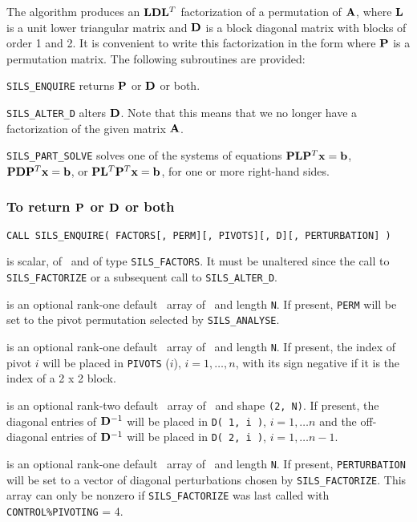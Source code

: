 \documentclass{galahad}
\newcommand{\packagename}{SILS}
\begin{document}
The algorithm produces an ${\mathbf{L}} {\mathbf{D}} {\mathbf{L}}^T$ factorization 
of a permutation of ${\mathbf{A}}$, where ${\mathbf{L}}$ is a unit lower triangular 
matrix and ${\mathbf{D}}$ is a block diagonal matrix with blocks of order 
1 and 2. It is convenient to write this factorization in the form 
where ${\mathbf{P}}$ is a permutation matrix. The following subroutines 
are provided: 
\begin{description} 
\ittf{} {\tt \packagename\_ENQUIRE} returns ${\mathbf{P}}$ or ${\mathbf{D}}$ or both. 
 
\ittf{} {\tt \packagename\_ALTER\_D} alters ${\mathbf{D}}$. Note that this means that 
we no longer have a factorization of the given matrix ${\mathbf{A}}$. 
 
\ittf{} {\tt \packagename\_PART\_SOLVE} solves one of the systems of equations 
${\mathbf{P}} {\mathbf{L}} {\mathbf{P}}^T {\mathbf{x}} =  {\mathbf{b}}$,  
${\mathbf{P}} {\mathbf{D}} {\mathbf{P}}^T {\mathbf{x}} =  {\mathbf{b}}$, or 
${\mathbf{P}} {\mathbf{L}}^T {\mathbf{P}}^T {\mathbf{x}} =  {\mathbf{b}}$, 
for one or more right-hand sides. 
 
\end{description} 
 
\subsubsection{To return ${\mathbf{P}}$ or ${\mathbf{D}}$ or both}
 
\hskip0.5in 
{\tt CALL \packagename\_ENQUIRE( FACTORS[, PERM][, PIVOTS][, D][, PERTURBATION] )}
 
\begin{description} 
 is scalar, of \intentin\ and of type {\tt \packagename\_FACTORS}.
It must be unaltered since the call to {\tt \packagename\_FACTORIZE} 
or a subsequent call to {\tt \packagename\_ALTER\_D}. 
 
 is an optional rank-one default \integer\ array of \intentout\
 and length {\tt N}.
If present, {\tt PERM} will be set to the pivot permutation
selected by {\tt \packagename\_ANALYSE}.
  
 is an optional rank-one default \integer\ array of \intentout\
 and length {\tt N}.
If present, the index of pivot $i$ will be placed in 
{\tt PIVOTS} ($i$), $i = 1, \ldots, n$, with its sign negative if it is 
the index of a 2 x 2 block. 
  
 is an optional rank-two default \realdp\ array
of \intentout\, and shape {\tt (2, N)}.
If present, the diagonal entries of ${\mathbf{D}}^{-1} $ will 
be placed in {\tt D( 1, i )}, $i = 1, \ldots n$ and the off-diagonal 
entries of ${\mathbf{D}}^{-1} $ will be placed in {\tt D( 2, i )}, 
$i = 1, \ldots n-1$. 

 is an optional rank-one default \realdp\ array of 
\intentout\ and length {\tt N}.
If present, {\tt PERTURBATION} will be set to a vector of diagonal perturbations
chosen by {\tt \packagename\_FACTORIZE}. This array can only be nonzero if
{\tt \packagename\_FACTORIZE} was last called with {\tt CONTROL\%PIVOTING} = 4.

\end{description} 
 
\end{document}
